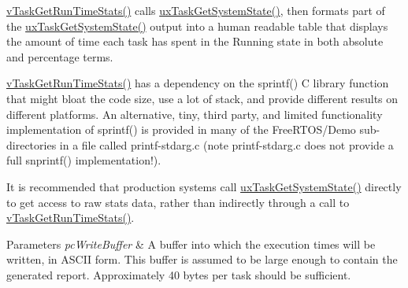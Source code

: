 \mbox{\hyperlink{task_8h_a52da9b427041a48dc9f6802e10f151d4}{v\+Task\+Get\+Run\+Time\+Stats()}} calls \mbox{\hyperlink{task_8h_aa4603f3de3d809e9beb18d10fbac005d}{ux\+Task\+Get\+System\+State()}}, then formats part of the \mbox{\hyperlink{task_8h_aa4603f3de3d809e9beb18d10fbac005d}{ux\+Task\+Get\+System\+State()}} output into a human readable table that displays the amount of time each task has spent in the Running state in both absolute and percentage terms.

\mbox{\hyperlink{task_8h_a52da9b427041a48dc9f6802e10f151d4}{v\+Task\+Get\+Run\+Time\+Stats()}} has a dependency on the sprintf() C library function that might bloat the code size, use a lot of stack, and provide different results on different platforms. An alternative, tiny, third party, and limited functionality implementation of sprintf() is provided in many of the Free\+R\+T\+O\+S/\+Demo sub-\/directories in a file called printf-\/stdarg.\+c (note printf-\/stdarg.\+c does not provide a full snprintf() implementation!).

It is recommended that production systems call \mbox{\hyperlink{task_8h_aa4603f3de3d809e9beb18d10fbac005d}{ux\+Task\+Get\+System\+State()}} directly to get access to raw stats data, rather than indirectly through a call to \mbox{\hyperlink{task_8h_a52da9b427041a48dc9f6802e10f151d4}{v\+Task\+Get\+Run\+Time\+Stats()}}.


\begin{DoxyParams}{Parameters}
{\em pc\+Write\+Buffer} & A buffer into which the execution times will be written, in A\+S\+C\+II form. This buffer is assumed to be large enough to contain the generated report. Approximately 40 bytes per task should be sufficient. \\
\hline
\end{DoxyParams}
